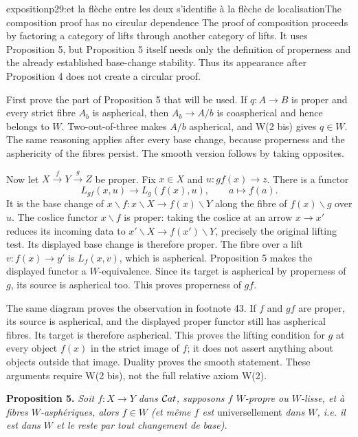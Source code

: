 \begin{dcomment}{exposition}{p29:et la flèche entre les deux s'identifie à la flèche de localisation}{The composition proof has no circular dependence}
The proof of composition proceeds by factoring a category of lifts through another category of lifts. It uses Proposition 5, but Proposition 5 itself needs only the definition of properness and the already established base-change stability. Thus its appearance after Proposition 4 does not create a circular proof.

First prove the part of Proposition 5 that will be used. If $q:A\to B$ is proper and every strict fibre $A_b$ is aspherical, then $A_b\to A/b$ is coaspherical and hence belongs to $W$. Two-out-of-three makes $A/b$ aspherical, and W(2 bis) gives $q\in W$. The same reasoning applies after every base change, because properness and the asphericity of the fibres persist. The smooth version follows by taking opposites.

Now let $X\xrightarrow fY\xrightarrow gZ$ be proper. Fix $x\in X$ and $u:gf(x)\to z$. There is a functor
\[
 L_{gf}(x,u)\longrightarrow L_g(f(x),u),\qquad a\longmapsto f(a).
\]
It is the base change of $x\backslash f:x\backslash X\to f(x)\backslash Y$ along the fibre of $f(x)\backslash g$ over $u$. The coslice functor $x\backslash f$ is proper: taking the coslice at an arrow $x\to x'$ reduces its incoming data to $x'\backslash X\to f(x')\backslash Y$, precisely the original lifting test. Its displayed base change is therefore proper. The fibre over a lift $v:f(x)\to y'$ is $L_f(x,v)$, which is aspherical. Proposition 5 makes the displayed functor a $W$-equivalence. Since its target is aspherical by properness of $g$, its source is aspherical too. This proves properness of $gf$.

The same diagram proves the observation in footnote 43. If $f$ and $gf$ are proper, its source is aspherical, and the displayed proper functor still has aspherical fibres. Its target is therefore aspherical. This proves the lifting condition for $g$ at every object $f(x)$ in the strict image of $f$; it does not assert anything about objects outside that image. Duality proves the smooth statement. These arguments require W(2 bis), not the full relative axiom W(2).
\end{dcomment}


\textbf{Proposition 5.} \textit{Soit $f : X\longrightarrow Y$ dans $\mathcal{C}at$, supposons $f$ $W$-propre ou $W$-lisse, et à fibres $W$-asphériques, alors $f\in W$ (et même $f$ est} \textup{universellement} \textit{dans $W$, i.e. il est dans $W$ et le reste par tout changement de base).}

